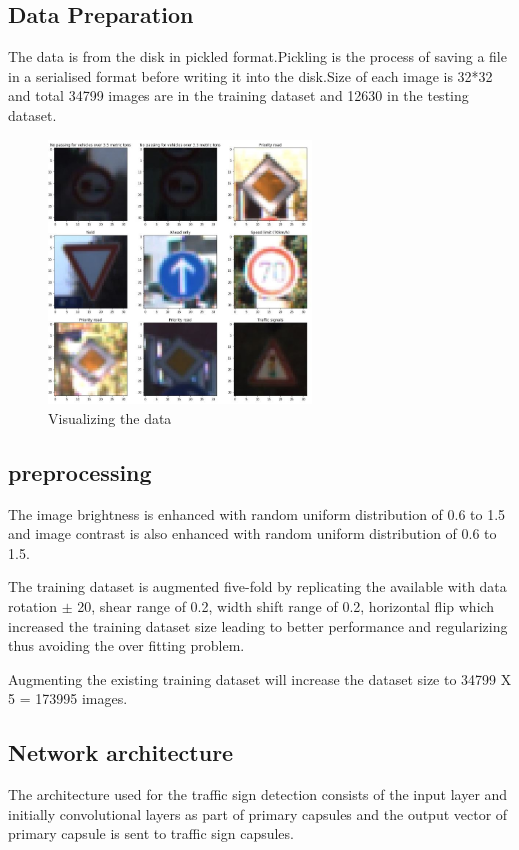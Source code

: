 \documentclass[letterpaper, 10 pt, conference]{ieeeconf}  %
\begin{document}
\subsection{Data Preparation}
The data is from the disk in pickled format.Pickling is the process of saving a file in a serialised format before writing it into the disk.Size of each image is 32*32 and total 34799 images are in the training dataset and 12630 in the testing dataset.\par
\begin{figure}[ht]
\centerline{\includegraphics[width=7cm, height=7cm]{sign1}}
\caption{Visualizing the data}
\end{figure}
\subsection{preprocessing}
The image brightness is enhanced with random uniform distribution of 0.6 to 1.5 and image contrast is also enhanced with random uniform distribution of 0.6 to 1.5.\par
The training dataset is augmented five-fold by replicating the available with data rotation $ \pm $ 20, shear range of 0.2, width shift range of 0.2, horizontal flip which increased the training dataset size leading to better performance and regularizing thus avoiding the over fitting problem.\par
Augmenting the existing training dataset will increase the dataset size to 34799 X 5 = 173995 images.
\subsection{Network architecture}
The architecture used for the traffic sign detection consists of the input layer and initially convolutional layers as part of primary capsules and the output vector of primary capsule is sent to traffic sign capsules.
\end{document}
